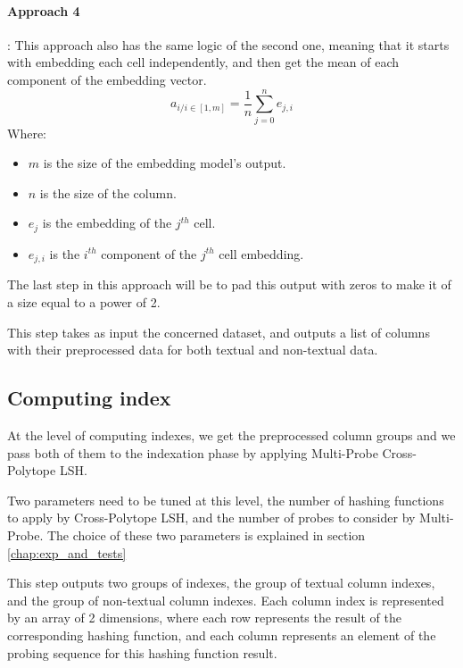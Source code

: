 \paragraph{Approach 4}: This approach also has the same logic of the second one,
meaning that it starts with embedding each cell independently, and then get the
mean of each component of the embedding vector.
\begin{equation}
    a_{i / i \in [1, m]} = \frac{1}{n} \sum_{j=0}^{n} e_{j, i}
\end{equation}
Where:
\begin{multicols}{2}
    \begin{itemize}
        \item $m$ is the size of the embedding model's output.
        \item $n$ is the size of the column.
        \item $e_j$ is the embedding of the $j^{th}$ cell.
        \item $e_{j, i}$ is the $i^{th}$ component of the $j^{th}$ cell
        embedding.
    \end{itemize}
\end{multicols}

The last step in this approach will be to pad this output with zeros to make it
of a size equal to a power of 2.


This step takes as input the concerned dataset, and outputs a list of columns
with their preprocessed data for both textual and non-textual data.

\subsection{Computing index}
At the level of computing indexes, we get the preprocessed column groups and we
pass both of them to the indexation phase by applying Multi-Probe Cross-Polytope
LSH.

Two parameters need to be tuned at this level, the number of hashing functions
to apply by Cross-Polytope LSH, and the number of probes to consider by
Multi-Probe. The choice of these two parameters is explained in section
\ref{chap:exp_and_tests}

This step outputs two groups of indexes, the group of textual column indexes, and
the group of non-textual column indexes. Each column index is represented by an
array of 2 dimensions, where each row represents the result of the corresponding
hashing function, and each column represents an element of the probing sequence
for this hashing function result.

